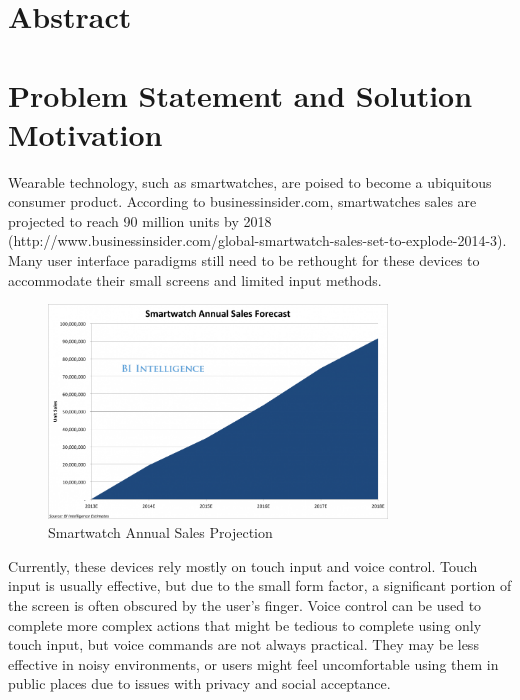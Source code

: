 \documentclass{article}
\begin{document}

\section{Abstract}


\section{Problem Statement and Solution Motivation}
Wearable technology, such as smartwatches, are poised to become a ubiquitous consumer product. According to businessinsider.com, smartwatches sales are projected to reach 90 million units by 2018 (http://www.businessinsider.com/global-smartwatch-sales-set-to-explode-2014-3). Many user interface paradigms still need to be rethought for these devices to accommodate their small screens and limited input methods. 

\begin{figure}[ht!]
  \centering
  \includegraphics[width=90mm]{smartwatch.png}
  \caption{Smartwatch Annual Sales Projection \label{overflow}}
\end{figure}

Currently, these devices rely mostly on touch input and voice control. Touch input is usually effective, but due to the small form factor, a significant portion of the screen is often obscured by the user's finger. Voice control can be used to complete more complex actions that might be tedious to complete using only touch input, but voice commands are not always practical. They may be less effective in noisy environments, or users might feel uncomfortable using them in public places due to issues with privacy and social acceptance.
\end{document}
